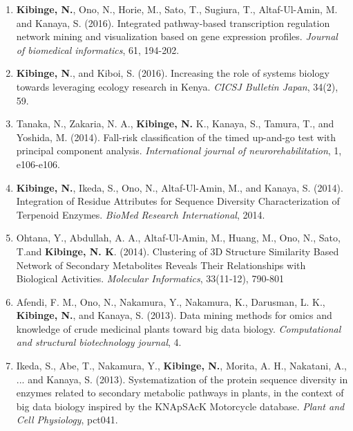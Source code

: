 \documentclass[10pt]{article}
\makeatletter
\newlength{\bibhang}
\newlength{\bibsep}
{\@listi \global\bibsep\itemsep \global\advance\bibsep by\parsep}
\newenvironment{bibsection}%
{\begin{enumerate}{}{%
			\setlength{\leftmargin}{\bibhang}%
			\setlength{\itemindent}{-\leftmargin}%
			\setlength{\itemsep}{\bibsep}%
			\setlength{\parsep}{\z@}%
			\setlength{\partopsep}{0pt}%
			\setlength{\topsep}{0pt}}}
	{\end{enumerate}\vspace{-.6\baselineskip}}
\makeatother
\begin{document}
\begin{bibsection}
	\item \textbf{Kibinge, N.}, Ono, N., Horie, M., Sato, T., Sugiura, T., Altaf-Ul-Amin, M. and Kanaya, S. (2016). Integrated pathway-based transcription regulation network mining and visualization based on gene expression profiles. \textit{Journal of biomedical informatics}, 61, 194-202. 
	
	\item \textbf{Kibinge, N}., and Kiboi, S. (2016). Increasing the role of systems biology towards leveraging ecology research in Kenya. \textit{CICSJ Bulletin Japan}, 34(2), 59.
	
	\item Tanaka, N., Zakaria, N. A., \textbf{Kibinge, N.} K., Kanaya, S., Tamura, T., and Yoshida, M. (2014). Fall-risk classification of the timed up-and-go test with principal component analysis. \textit{International journal of neurorehabilitation}, 1, e106-e106.
	
	\item \textbf{Kibinge, N.}, Ikeda, S., Ono, N., Altaf-Ul-Amin, M., and Kanaya, S. (2014). Integration of Residue Attributes for Sequence Diversity Characterization of Terpenoid Enzymes. \textit{BioMed Research International}, 2014.
	\item Ohtana, Y., Abdullah, A. A., Altaf‐Ul‐Amin, M., Huang, M., Ono, N., Sato, T.and \textbf{Kibinge, N. K}. (2014). Clustering of 3D Structure Similarity Based Network of Secondary Metabolites Reveals Their Relationships with Biological Activities. \textit{Molecular Informatics}, 33(11‐12), 790-801
	\item Afendi, F. M., Ono, N., Nakamura, Y., Nakamura, K., Darusman, L. K., \textbf{Kibinge, N.}, and Kanaya, S. (2013). Data mining methods for omics and knowledge of crude medicinal plants toward big data biology. \textit{Computational and structural biotechnology journal}, 4.
	\item Ikeda, S., Abe, T., Nakamura, Y.,\textbf{ Kibinge, N.}, Morita, A. H., Nakatani, A., ... and Kanaya, S. (2013). Systematization of the protein sequence diversity in enzymes related to secondary metabolic pathways in plants, in the context of big data biology inspired by the KNApSAcK Motorcycle database. \textit{Plant and Cell Physiology}, pct041.
	
\end{bibsection}
\end{document}
